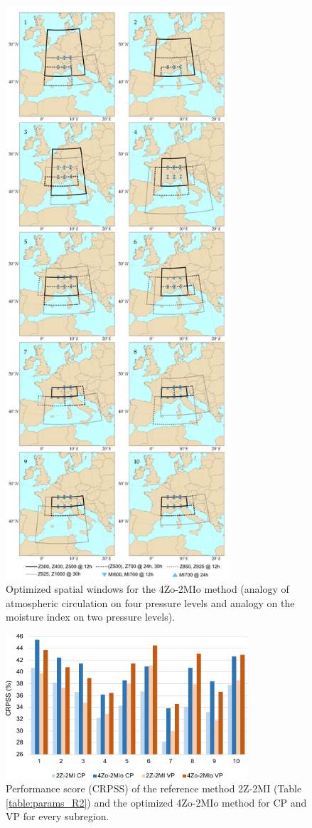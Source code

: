 \documentclass[review]{elsarticle}
\begin{document}
\begin{figure}[t]
	\centerline{\includegraphics[width=8.4cm]{figures/fig06.pdf}}
	\caption{Optimized spatial windows for the 4Zo-2MIo method (analogy of atmospheric circulation on four pressure levels and analogy on the moisture index on two pressure levels).}
	\label{fig:spatial_windows_4Zo-2MIo}
\end{figure}

\begin{figure}[t]
	\centerline{\includegraphics[width=9cm]{figures/fig07.pdf}}
	\caption{Performance score (CRPSS) of the reference method 2Z-2MI (Table \ref{table:params_R2}) and the optimized 4Zo-2MIo method for CP and VP for every subregion.}
	\label{fig:figure_crpss_4Zo-2HIo}
\end{figure}
\end{document}
